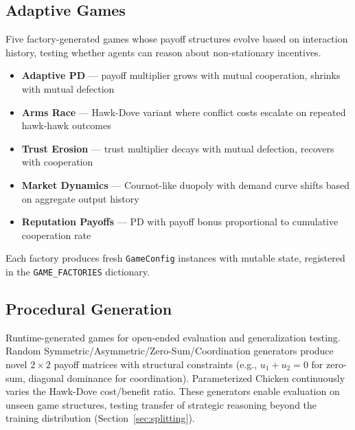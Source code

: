 
\subsection{Adaptive Games}
\label{sec:adaptive}

Five factory-generated games whose payoff structures evolve based on
interaction history, testing whether agents can reason about non-stationary
incentives.

\begin{itemize}[nosep]
    \item \textbf{Adaptive PD} --- payoff multiplier grows with mutual
          cooperation, shrinks with mutual defection
    \item \textbf{Arms Race} --- Hawk-Dove variant where conflict costs
          escalate on repeated hawk-hawk outcomes
    \item \textbf{Trust Erosion} --- trust multiplier decays with mutual
          defection, recovers with cooperation
    \item \textbf{Market Dynamics} --- Cournot-like duopoly with demand
          curve shifts based on aggregate output history
    \item \textbf{Reputation Payoffs} --- PD with payoff bonus
          proportional to cumulative cooperation rate
\end{itemize}

\noindent Each factory produces fresh \texttt{GameConfig} instances with
mutable state, registered in the \texttt{GAME\_FACTORIES} dictionary.

\subsection{Procedural Generation}
\label{sec:procedural}

Runtime-generated games for open-ended evaluation and generalization testing.
Random Symmetric/Asymmetric/Zero-Sum/Coordination generators produce novel
$2\times 2$ payoff matrices with structural constraints (e.g., $u_1 + u_2 = 0$
for zero-sum, diagonal dominance for coordination). Parameterized Chicken
continuously varies the Hawk-Dove cost/benefit ratio. These generators
enable evaluation on unseen game structures, testing transfer of strategic
reasoning beyond the training distribution (Section~\ref{sec:splitting}).

